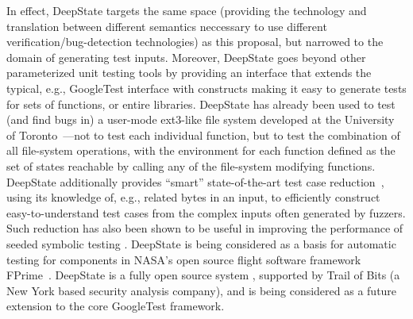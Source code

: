 
In effect, DeepState targets the same space (providing the technology and translation between different semantics neccessary to use different verification/bug-detection technologies) as this proposal, but narrowed to the domain of generating test inputs.  Moreover, DeepState goes beyond other parameterized unit testing tools by providing an interface that extends the typical, e.g., GoogleTest interface with constructs making it easy to generate tests for sets of functions, or entire libraries.  DeepState has already been used to test (and find bugs in) a user-mode ext3-like file system developed at the University of Toronto~\cite{testfs,testfsrepo}---not to test each individual function, but to test the combination of all file-system operations, with the environment for each function defined as the set of states reachable by calling any of the file-system modifying functions.  DeepState additionally provides ``smart'' state-of-the-art test case reduction~\cite{OneTest}, using its knowledge of, e.g., related bytes in an input, to efficiently construct easy-to-understand test cases from the complex inputs often generated by fuzzers.  Such reduction has also been shown to be useful in improving the performance of seeded symbolic testing \cite{issta14}.
DeepState is being considered as a basis for automatic testing for components in NASA's open source flight software framework FPrime~\cite{fprime,fprimerepo}.  DeepState is a fully open source system \cite{deepstaterepo}, supported by Trail of Bits (a New York based security analysis company), and is being considered as a future extension to the core GoogleTest framework.